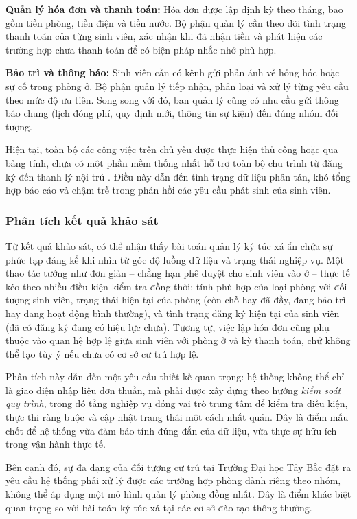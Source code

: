 \documentclass[13pt,a4paper]{extarticle}
\numberwithin{figure}{section}
\numberwithin{table}{section}
\begin{document}
	\textbf{Quản lý hóa đơn và thanh toán:} Hóa đơn được lập định kỳ theo tháng, bao gồm tiền phòng, tiền điện và tiền nước. Bộ phận quản lý cần theo dõi tình trạng thanh toán của từng sinh viên, xác nhận khi đã nhận tiền và phát hiện các trường hợp chưa thanh toán để có biện pháp nhắc nhở phù hợp.
	
	\textbf{Bảo trì và thông báo:} Sinh viên cần có kênh gửi phản ánh về hỏng hóc hoặc sự cố trong phòng ở. Bộ phận quản lý tiếp nhận, phân loại và xử lý từng yêu cầu theo mức độ ưu tiên. Song song với đó, ban quản lý cũng có nhu cầu gửi thông báo chung (lịch đóng phí, quy định mới, thông tin sự kiện) đến đúng nhóm đối tượng.
	
	Hiện tại, toàn bộ các công việc trên chủ yếu được thực hiện thủ công hoặc qua bảng tính, chưa có một phần mềm thống nhất hỗ trợ toàn bộ chu trình từ đăng ký đến thanh lý nội trú \cite{utb_phongsban}. Điều này dẫn đến tình trạng dữ liệu phân tán, khó tổng hợp báo cáo và chậm trễ trong phản hồi các yêu cầu phát sinh của sinh viên.
	
	\subsubsection{Phân tích kết quả khảo sát}
	
	Từ kết quả khảo sát, có thể nhận thấy bài toán quản lý ký túc xá ẩn chứa sự phức tạp đáng kể khi nhìn từ góc độ luồng dữ liệu và trạng thái nghiệp vụ. Một thao tác tưởng như đơn giản -- chẳng hạn phê duyệt cho sinh viên vào ở -- thực tế kéo theo nhiều điều kiện kiểm tra đồng thời: tính phù hợp của loại phòng với đối tượng sinh viên, trạng thái hiện tại của phòng (còn chỗ hay đã đầy, đang bảo trì hay đang hoạt động bình thường), và tình trạng đăng ký hiện tại của sinh viên (đã có đăng ký đang có hiệu lực chưa). Tương tự, việc lập hóa đơn cũng phụ thuộc vào quan hệ hợp lệ giữa sinh viên với phòng ở và kỳ thanh toán, chứ không thể tạo tùy ý nếu chưa có cơ sở cư trú hợp lệ.
	
	Phân tích này dẫn đến một yêu cầu thiết kế quan trọng: hệ thống không thể chỉ là giao diện nhập liệu đơn thuần, mà phải được xây dựng theo hướng \textit{kiểm soát quy trình}, trong đó tầng nghiệp vụ đóng vai trò trung tâm để kiểm tra điều kiện, thực thi ràng buộc và cập nhật trạng thái một cách nhất quán. Đây là điểm mấu chốt để hệ thống vừa đảm bảo tính đúng đắn của dữ liệu, vừa thực sự hữu ích trong vận hành thực tế.
	
	Bên cạnh đó, sự đa dạng của đối tượng cư trú tại Trường Đại học Tây Bắc đặt ra yêu cầu hệ thống phải xử lý được các trường hợp phòng dành riêng theo nhóm, không thể áp dụng một mô hình quản lý phòng đồng nhất. Đây là điểm khác biệt quan trọng so với bài toán ký túc xá tại các cơ sở đào tạo thông thường.
	
\end{document}
